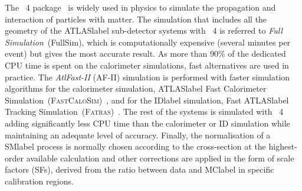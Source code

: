 The \GEANT~4 package~\cite{AGOSTINELLI2003250} is widely used in physics to simulate the propagation and interaction of particles with matter. The simulation that includes all the geometry of the \acrshort{ATLASlabel} sub-detector systems with \GEANT~4 is referred to \textit{Full Simulation}~(FullSim), which is computationally expensive (several minutes per event) but gives the most accurate result. As more than 90\% of the dedicated CPU time is spent on the calorimeter simulations, fast alternatives are used in practice. The \textit{AtlFast-II} (AF-II) simulation is performed with faster simulation algorithms for the calorimeter simulation, \acrshort{ATLASlabel} Fast Calorimeter Simulation~(\textsc{FastCaloSim})~\cite{ATLAS:1300517}, and for the \acrshort{IDlabel} simulation, Fast \acrshort{ATLASlabel} Tracking Simulation~(\textsc{Fatras})~\cite{Edmonds:1091969}. The rest of the systems is simulated with \GEANT~4 adding significantly less CPU time than the calorimeter or ID simulation while maintaining an adequate level of accuracy. Finally, the normalisation of a \acrshort{SMlabel} process is normally chosen according to the cross-section at the highest-order available calculation and other corrections are applied in the form of scale factors (SFs), derived from the ratio between data and \acrshort{MClabel} in specific calibration regions.